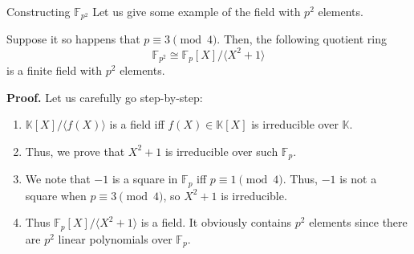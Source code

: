 \documentclass{zkdl-presentation-template}
\begin{document}
    \begin{frame}{Constructing $\mathbb{F}_{p^2}$} 
        Let us give some example of the field with $p^2$ elements.

        \begin{example}
            Suppose it so happens that $p \equiv 3 \pmod{4}$. Then, the 
            following quotient ring
            \begin{equation*}
                \mathbb{F}_{p^2} \cong \mathbb{F}_p[X] / \langle X^2+1 \rangle
            \end{equation*}
            is a finite field with $p^2$ elements.
        \end{example}
        \vspace{-10px}
        \textbf{Proof.} Let us carefully go step-by-step:
        \begin{enumerate}
            \item $\mathbb{K}[X]/\langle f(X) \rangle$ is a field iff $f(X) \in
            \mathbb{K}[X]$ is irreducible over $\mathbb{K}$.
            \item Thus, we prove that $X^2+1$ is irreducible over such $\mathbb{F}_p$.
            \item We note that $-1$ is a square in $\mathbb{F}_p$ iff $p \equiv 1 \pmod{4}$. Thus,
            $-1$ is not a square when $p \equiv 3 \pmod{4}$, so $X^2+1$ is irreducible.
            \item Thus $ \mathbb{F}_p[X] / \langle X^2+1 \rangle$ is a field. It
            obviously contains $p^2$ elements since there are $p^2$ linear
            polynomials over $\mathbb{F}_p$.
        \end{enumerate}
    \end{frame}
\end{document}
